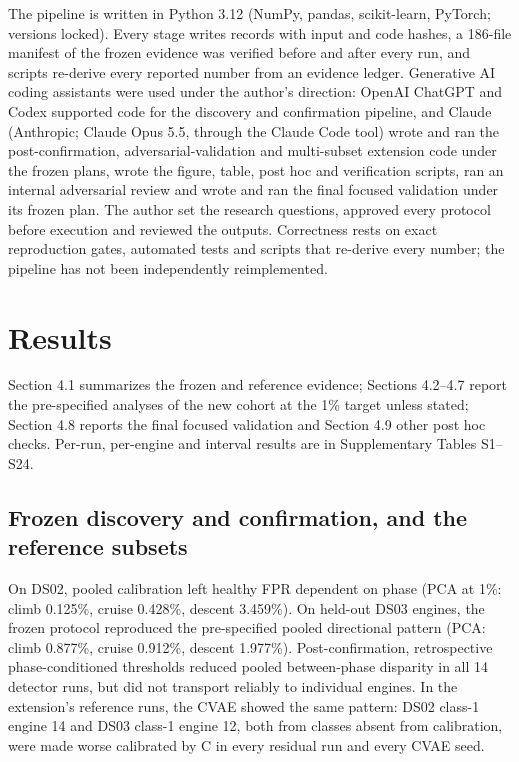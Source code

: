 \documentclass[preprint,11pt,a4paper]{elsarticle}
\begin{document}
The pipeline is written in Python 3.12 (NumPy, pandas, scikit-learn, PyTorch; versions locked). Every stage writes records with input and code hashes, a 186-file manifest of the frozen evidence was verified before and after every run, and scripts re-derive every reported number from an evidence ledger. Generative AI coding assistants were used under the author's direction: OpenAI ChatGPT and Codex supported code for the discovery and confirmation pipeline, and Claude (Anthropic; Claude Opus 5.5, through the Claude Code tool) wrote and ran the post-confirmation, adversarial-validation and multi-subset extension code under the frozen plans, wrote the figure, table, post hoc and verification scripts, ran an internal adversarial review and wrote and ran the final focused validation under its frozen plan. The author set the research questions, approved every protocol before execution and reviewed the outputs. Correctness rests on exact reproduction gates, automated tests and scripts that re-derive every number; the pipeline has not been independently reimplemented.

\section{Results}

Section 4.1 summarizes the frozen and reference evidence; Sections 4.2–4.7 report the pre-specified analyses of the new cohort at the 1\% target unless stated; Section 4.8 reports the final focused validation and Section 4.9 other post hoc checks. Per-run, per-engine and interval results are in Supplementary Tables S1–S24.

\subsection{Frozen discovery and confirmation, and the reference subsets}

On DS02, pooled calibration left healthy FPR dependent on phase (PCA at 1\%: climb 0.125\%, cruise 0.428\%, descent 3.459\%). On held-out DS03 engines, the frozen protocol reproduced the pre-specified pooled directional pattern (PCA: climb 0.877\%, cruise 0.912\%, descent 1.977\%). Post-confirmation, retrospective phase-conditioned thresholds reduced pooled between-phase disparity in all 14 detector runs, but did not transport reliably to individual engines. In the extension's reference runs, the CVAE showed the same pattern: DS02 class-1 engine 14 and DS03 class-1 engine 12, both from classes absent from calibration, were made worse calibrated by C in every residual run and every CVAE seed.
\end{document}
